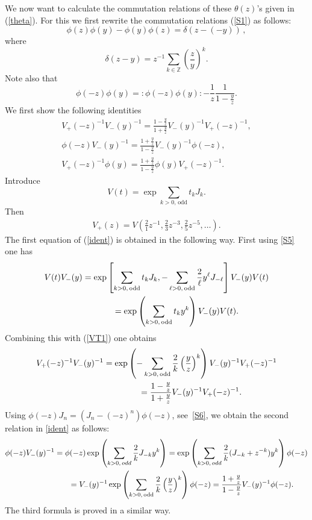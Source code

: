 \documentclass[11pt]{article}
\numberwithin{equation}{section}
\begin{document}
We now want to calculate the commutation relations of these
$\theta(z)$'s given in (\ref{theta}).  For this we f\/irst rewrite the commutation relations
(\ref{S1}) as follows:
\[
\phi(z)\phi(y)-\phi(y)\phi(z)=\delta(z-(-y))\,,
\]
where
\[
\delta(z-y)=z^{-1}\sum_{k\in\mathbb{Z}}
\left(\frac{z}{y}\right)^k.
\]
Note also that
\[
\phi(-z)\phi(y)={:}\phi(-z)\phi(y){:}-\frac{1}{z}\frac{1}{1-\frac{y}{z}}  .
\]
We f\/irst show the following identities
\begin{gather}
V_+(-z)^{-1}V_-(y)^{-1} =
\frac{1-\frac{y}{z}}{1+\frac{y}{z}}V_-(y)^{-1}V_+(-z)^{-1},\nonumber\\
\phi(-z)V_-(y)^{-1} =
\frac{1+\frac{y}{z}}{1-\frac{y}{z}}V_-(y)^{-1}\phi(-z),\nonumber\\
V_+(-z)^{-1}\phi(y) =
\frac{1+\frac{y}{z}}{1-\frac{y}{z}}\phi(y)V_+(-z)^{-1}.\label{ident}
\end{gather}
Introduce
\[
V(t)=\exp\sum_{k>0,\,\mathrm{odd}}t_k J_k .
\]
Then
\begin{gather}
\label{VT1}
V_+(z)=V\left(\frac21 z^{-1},\frac23 z^{-3},\frac25 z^{-5},\ldots\right) .
\end{gather}
The f\/irst equation of (\ref{ident}) is obtained in the following
way. First using \eqref{S5} one has
\begin{gather*}
V(t)V_-(y) =\exp \left[  \sum_{k>0,\,\mathrm{odd}} t_kJ_k,
- \sum_{\ell>0,\,\mathrm{odd}} \frac{2}{\ell}y^{\ell}J_{-\ell}\right]V_-(y)V(t)\\
\hphantom{V(t)V_-(y)}{}  =\exp \left(\sum_{k>0,\,\mathrm{odd}}t_{k}y^k
\right)
V_-(y)V(t)  .
\end{gather*}
Combining this with (\ref{VT1}) one obtains
\begin{gather*}
V_+(-z)^{-1}V_-(y)^{-1} =\exp \left(-\sum_{k>0,\,\mathrm{odd}} \frac{2}{k}\left(
\frac{y}{z}\right)^k\right)
V_-(y)^{-1}V_+(-z)^{-1}\\
\hphantom{V_+(-z)^{-1}V_-(y)^{-1}}{}
 =\frac{1-\frac{y}{z}}{1+\frac{y}{z}}V_-(y)^{-1}V_+(-z)^{-1}.
\end{gather*}
Using $\phi(-z)J_n=(J_n-(-z)^n)\phi(-z)$, see~\eqref{S6},
we obtain the second relation in \eqref{ident} as follows:
\begin{gather*}
\phi(-z)V_-(y)^{-1} =
\phi(-z)\exp\left(\sum_{k>0,\,\rm odd}\frac2kJ_{-k}y^k\right)
 =
\exp\left(\sum_{k>0,\,\rm odd}\frac2k(J_{-k}+z^{-k})y^k\right)\phi(-z)
\\
 \phantom{\phi(-z)V_-(y)^{-1}}{}
 =V_-(y)^{-1}\exp \left( \sum_{k>0,\,\mathrm{odd}}
\frac{2}{k}\left( \frac{y}{z}\right)^{k}\right)\phi(-z)
 =\frac{1+\frac{y}{z}}{1-\frac{y}{z}}V_-(y)^{-1}\phi(-z).
\end{gather*}
The third formula is proved in a similar way.
\end{document}
